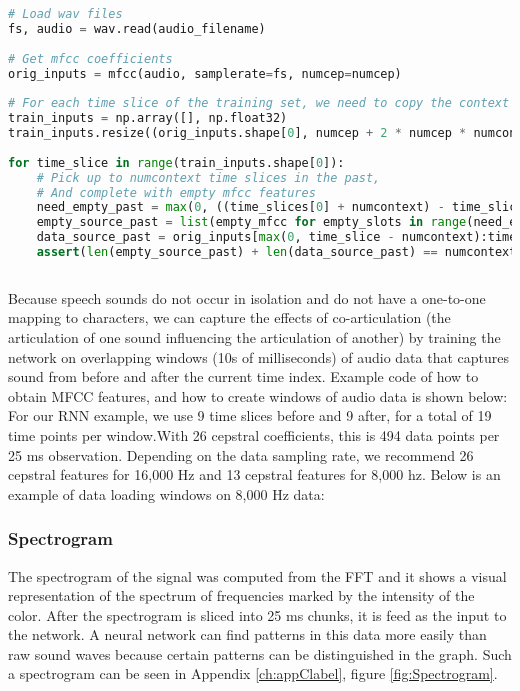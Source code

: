 \begin{lstlisting}[language = Python, label=lst:MFCC, caption = Example code to obtain MFCC features.]
# Load wav files
fs, audio = wav.read(audio_filename)
 
# Get mfcc coefficients
orig_inputs = mfcc(audio, samplerate=fs, numcep=numcep)
 
# For each time slice of the training set, we need to copy the context this makes
train_inputs = np.array([], np.float32)
train_inputs.resize((orig_inputs.shape[0], numcep + 2 * numcep * numcontext))
 
for time_slice in range(train_inputs.shape[0]):
    # Pick up to numcontext time slices in the past,
    # And complete with empty mfcc features
    need_empty_past = max(0, ((time_slices[0] + numcontext) - time_slice))
    empty_source_past = list(empty_mfcc for empty_slots in range(need_empty_past))
    data_source_past = orig_inputs[max(0, time_slice - numcontext):time_slice]
    assert(len(empty_source_past) + len(data_source_past) == numcontext)
    
\end{lstlisting}

Because speech sounds do not occur in isolation and do not have a one-to-one mapping to characters, we can capture the effects of co-articulation (the articulation of one sound influencing the articulation of another) by training the network on overlapping windows (10s of milliseconds) of audio data that captures sound from before and after the current time index. Example code of how to obtain MFCC features, and how to create windows of audio data is shown below:\\
For our RNN example, we use 9 time slices before and 9 after, for a total of 19 time points per window.With 26 cepstral coefficients, this is 494 data points per 25 ms observation. Depending on the data sampling rate, we recommend 26 cepstral features for 16,000 Hz and 13 cepstral features for 8,000 hz. Below is an example of data loading windows on 8,000 Hz data:
\subsubsection{Spectrogram}

The spectrogram of the signal was computed from the FFT and it shows a visual representation of the spectrum of frequencies marked by the intensity of the color.
After the spectrogram is sliced into 25 ms chunks, it is feed as the input to the network. 
A neural network can find patterns in this data more easily than raw sound waves because certain patterns can be distinguished in the graph. Such a spectrogram can be seen in Appendix \ref{ch:appClabel}, figure \ref{fig:Spectrogram}.


